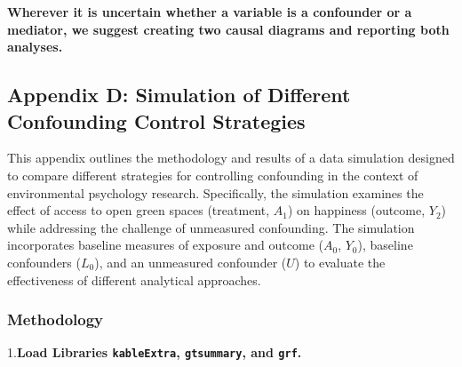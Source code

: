 \documentclass[
  singlecolumn]{article}
\begin{document}
\textbf{Wherever it is uncertain whether a variable is a confounder or a
mediator, we suggest creating two causal diagrams and reporting both
analyses.}

\newpage{}

\subsection{Appendix D: Simulation of Different Confounding Control
Strategies}\label{appendix-d}

This appendix outlines the methodology and results of a data simulation
designed to compare different strategies for controlling confounding in
the context of environmental psychology research. Specifically, the
simulation examines the effect of access to open green spaces
(treatment, \(A_1\)) on happiness (outcome, \(Y_2\)) while addressing
the challenge of unmeasured confounding. The simulation incorporates
baseline measures of exposure and outcome (\(A_0\), \(Y_0\)), baseline
confounders (\(L_0\)), and an unmeasured confounder (\(U\)) to evaluate
the effectiveness of different analytical approaches.

\subsubsection{Methodology}\label{methodology-1}

1.\textbf{Load Libraries \texttt{kableExtra}, \texttt{gtsummary}, and
\texttt{grf}.}
\end{document}
